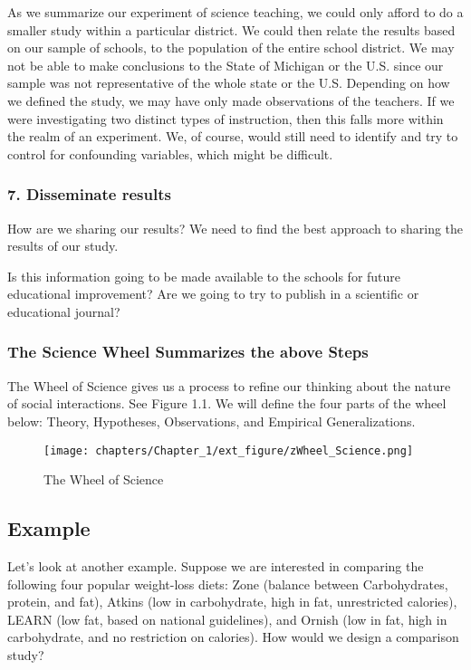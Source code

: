 \documentclass[11pt]{book}\usepackage[]{graphicx}\usepackage[]{color}
\begin{document}
As we summarize our experiment of science teaching, we could only afford to do a smaller study within a particular district.  We could then relate the results based on our sample of schools, to the population of the entire school district.  We may not be able to make conclusions to the State of Michigan or the U.S. since our sample was not representative of the whole state or the U.S.  Depending on how we defined the study, we may have only made observations of the teachers.  If we were investigating two distinct types of instruction, then this falls more within the realm of an experiment.  We, of course, would still need to identify and try to control for confounding variables, which might be difficult.

\subsubsection{7. Disseminate results}

How are we sharing our results?  We need to find the best approach to sharing the results of our study.

Is this information going to be made available to the schools for future educational improvement?  Are we going to try to publish in a scientific or educational journal?


\subsubsection{The Science Wheel Summarizes the above Steps}

The Wheel of Science  \citep{Wallace1971}
gives us a process to refine our thinking about the nature of social interactions.  See Figure 1.1.  We will define the four parts of the wheel below:  Theory, Hypotheses, Observations, and Empirical Generalizations.

\begin{figure}[htbp]
   \centering

\texttt{[image: chapters/Chapter\_1/ext\_figure/zWheel\_Science.png]} %

   \caption{The Wheel of Science}
   \label{fig:WS}
\end{figure}

\subsection{Example}

Let's look at another example.  Suppose we are interested in comparing the following four popular weight-loss diets: Zone (balance between Carbohydrates, protein, and fat), Atkins (low in carbohydrate, high in fat, unrestricted calories), LEARN (low fat, based on national guidelines), and Ornish (low in fat, high in carbohydrate, and no restriction on calories).   How would we design a comparison study?
\end{document}
